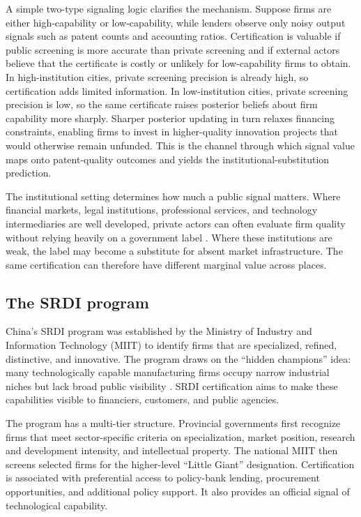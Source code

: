 \documentclass[12pt]{article}
\begin{document}
A simple two-type signaling logic clarifies the mechanism. Suppose firms are either high-capability or low-capability, while lenders observe only noisy output signals such as patent counts and accounting ratios. Certification is valuable if public screening is more accurate than private screening and if external actors believe that the certificate is costly or unlikely for low-capability firms to obtain. In high-institution cities, private screening precision is already high, so certification adds limited information. In low-institution cities, private screening precision is low, so the same certificate raises posterior beliefs about firm capability more sharply. Sharper posterior updating in turn relaxes financing constraints, enabling firms to invest in higher-quality innovation projects that would otherwise remain unfunded. This is the channel through which signal value maps onto patent-quality outcomes and yields the institutional-substitution prediction.

The institutional setting determines how much a public signal matters. Where financial markets, legal institutions, professional services, and technology intermediaries are well developed, private actors can often evaluate firm quality without relying heavily on a government label \citep{li2008,hall2010}. Where these institutions are weak, the label may become a substitute for absent market infrastructure. The same certification can therefore have different marginal value across places.

\subsection{The SRDI program}

China's SRDI program was established by the Ministry of Industry and Information Technology (MIIT) to identify firms that are specialized, refined, distinctive, and innovative. The program draws on the ``hidden champions'' idea: many technologically capable manufacturing firms occupy narrow industrial niches but lack broad public visibility \citep{simon2009}. SRDI certification aims to make these capabilities visible to financiers, customers, and public agencies.

The program has a multi-tier structure. Provincial governments first recognize firms that meet sector-specific criteria on specialization, market position, research and development intensity, and intellectual property. The national MIIT then screens selected firms for the higher-level ``Little Giant'' designation. Certification is associated with preferential access to policy-bank lending, procurement opportunities, and additional policy support. It also provides an official signal of technological capability.
\end{document}
